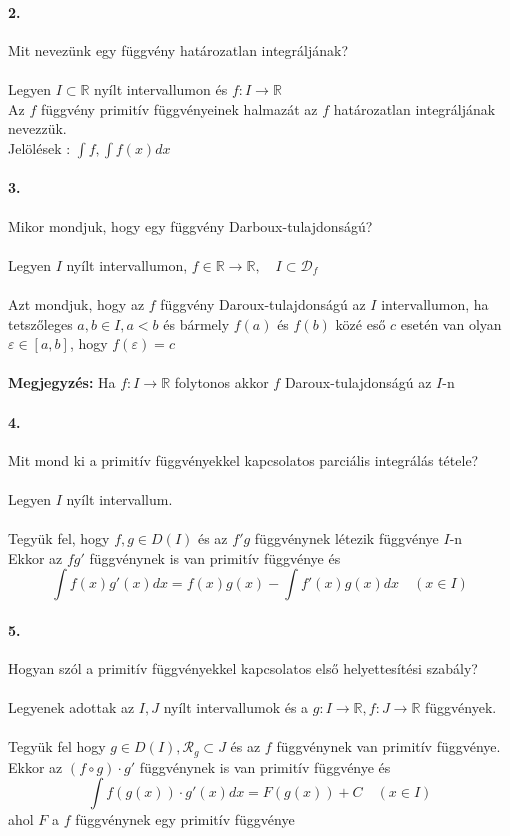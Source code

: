 \documentclass[10pt,a4paper]{article}
\newcommand{\R}{\mathbb{R}}
\newcommand{\D}{\mathcal{D}}
\newcommand{\fR}{f\in\R\rightarrow\R}
\renewcommand{\>}{\rightarrow}
\begin{document}
\paragraph{2.} 
Mit nevezünk egy függvény határozatlan integráljának? \\ \\
Legyen $I \subset \R$ nyílt intervallumon és $f : I \rightarrow \R$
\\
Az $f$ függvény primitív függvényeinek halmazát az $f$ határozatlan integráljának nevezzük. \\
Jelölések : $\int{f}, \int{f(x) dx}$
\paragraph{3.}
Mikor mondjuk, hogy egy függvény Darboux-tulajdonságú? \\ \\
Legyen $I$ nyílt intervallumon, $\fR , \quad	I \subset \D_f$
 \\ \\ Azt mondjuk, hogy az $f$ függvény Daroux-tulajdonságú az $I$ intervallumon, ha tetszőleges $a,b\in I, a<b$ és bármely $f(a)$ és $f(b)$ közé eső $c$ esetén van olyan $\varepsilon \in [a,b]$, hogy $f(\varepsilon) = c$ \\  \\
\textbf{Megjegyzés:} Ha $f:I\rightarrow \R$ folytonos akkor $f$ Daroux-tulajdonságú az $I$-n
\paragraph{4.}
Mit mond ki a primitív függvényekkel kapcsolatos parciális integrálás tétele?
 \\ \\
Legyen $I$ nyílt intervallum. \\ \\
Tegyük fel, hogy $f,g \in D(I)$ és az $f'g$ függvénynek létezik függvénye $I$-n \\
Ekkor az $fg'$ függvénynek is van primitív függvénye és 
\[
\int{f(x)g'(x)dx} = f(x)g(x)-\int{f'(x)g(x)dx} \quad (x\in I)
\]
\paragraph{5.}
Hogyan szól a primitív függvényekkel kapcsolatos első helyettesítési szabály? \\\\
Legyenek adottak az $I,J$ nyílt intervallumok és a $g: I \rightarrow \R ,f: J \rightarrow \R $ függvények. \\\\
Tegyük fel hogy $g\in D(I), \mathcal{R}_g \subset J $ és az $f$ függvénynek van primitív függvénye. Ekkor az $(f \circ g) \cdot g'$ függvénynek is van primitív függvénye és 
\[
\int{f(g(x))\cdot g'(x)dx} = F(g(x))+C \quad (x\in I)
\] 
ahol $F$ a $f$ függvénynek egy primitív függvénye
\end{document}
